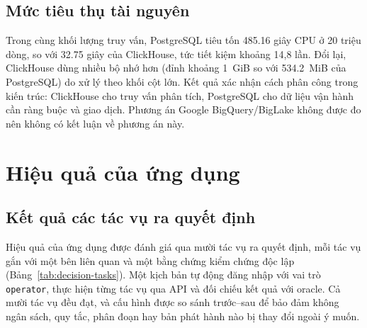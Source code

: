 \subsection{Mức tiêu thụ tài nguyên}
\label{sec:c5-tai-nguyen}
Trong cùng khối lượng truy vấn, PostgreSQL tiêu tốn \num{485.16} giây CPU ở 20 triệu dòng, so với \num{32.75} giây của ClickHouse, tức tiết kiệm khoảng 14,8 lần. Đổi lại, ClickHouse dùng nhiều bộ nhớ hơn (đỉnh khoảng 1~GiB so với \num{534.2}~MiB của PostgreSQL) do xử lý theo khối cột lớn. Kết quả xác nhận cách phân công trong kiến trúc: ClickHouse cho truy vấn phân tích, PostgreSQL cho dữ liệu vận hành cần ràng buộc và giao dịch. Phương án Google BigQuery/BigLake không được đo nên không có kết luận về phương án này.

\section{Hiệu quả của ứng dụng}
\label{sec:c5-hieu-qua-ung-dung}

\subsection{Kết quả các tác vụ ra quyết định}
\label{sec:c5-decision-tasks}
Hiệu quả của ứng dụng được đánh giá qua mười tác vụ ra quyết định, mỗi tác vụ gắn với một bên liên quan và một bằng chứng kiểm chứng độc lập (Bảng~\ref{tab:decision-tasks}). Một kịch bản tự động đăng nhập với vai trò \texttt{operator}, thực hiện từng tác vụ qua API và đối chiếu kết quả với oracle. Cả mười tác vụ đều đạt, và cấu hình được so sánh trước--sau để bảo đảm không ngân sách, quy tắc, phân đoạn hay bản phát hành nào bị thay đổi ngoài ý muốn.

